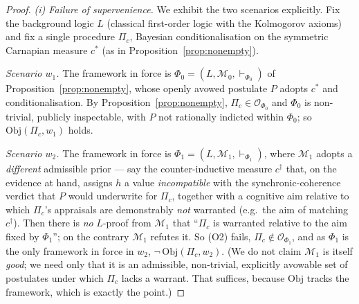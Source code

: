 \documentclass{amsart}
\theoremstyle{definition}
\theoremstyle{plain}
\theoremstyle{remark}
\begin{document}
\begin{proof}
\emph{(i) Failure of supervenience.} We exhibit the two scenarios explicitly.
Fix the background logic $L$ (classical first-order logic with the Kolmogorov
axioms) and fix a single procedure $\Pi_c$, Bayesian conditionalisation on the
symmetric Carnapian measure $c^\ast$ (as in Proposition~\ref{prop:nonempty}).

\emph{Scenario $w_1$.} The framework in force is $\Phi_0=(L,\mathcal{M}_0,
\vdash_{\Phi_0})$ of Proposition~\ref{prop:nonempty}, whose openly avowed
postulate $P$ adopts $c^\ast$ and conditionalisation. By
Proposition~\ref{prop:nonempty}, $\Pi_c\in\mathcal{O}_{\Phi_0}$ and $\Phi_0$ is
non-trivial, publicly inspectable, with $P$ not rationally indicted within
$\Phi_0$; so $\mathrm{Obj}(\Pi_c,w_1)$ holds.

\emph{Scenario $w_2$.} The framework in force is
$\Phi_1=(L,\mathcal{M}_1,\vdash_{\Phi_1})$, where $\mathcal{M}_1$ adopts a
\emph{different} admissible prior --- say the counter-inductive measure
$c^{\dagger}$ that, on the evidence at hand, assigns $h$ a value
\emph{incompatible} with the synchronic-coherence verdict that $P$ would
underwrite for $\Pi_c$, together with a cognitive aim relative to which
$\Pi_c$'s appraisals are demonstrably \emph{not} warranted (e.g.\ the aim of
matching $c^{\dagger}$). Then there is \emph{no} $L$-proof from $\mathcal{M}_1$
that ``$\Pi_c$ is warranted relative to the aim fixed by $\Phi_1$''; on the
contrary $\mathcal{M}_1$ refutes it. So (O2) fails, $\Pi_c\notin
\mathcal{O}_{\Phi_1}$, and as $\Phi_1$ is the only framework in force in $w_2$,
$\neg\,\mathrm{Obj}(\Pi_c,w_2)$. (We do not claim $\mathcal{M}_1$ is itself
\emph{good}; we need only that it is an admissible, non-trivial, explicitly
avowable set of postulates under which $\Pi_c$ lacks a warrant. That suffices,
because $\mathrm{Obj}$ tracks the framework, which is exactly the point.)


\end{proof}
\end{document}
